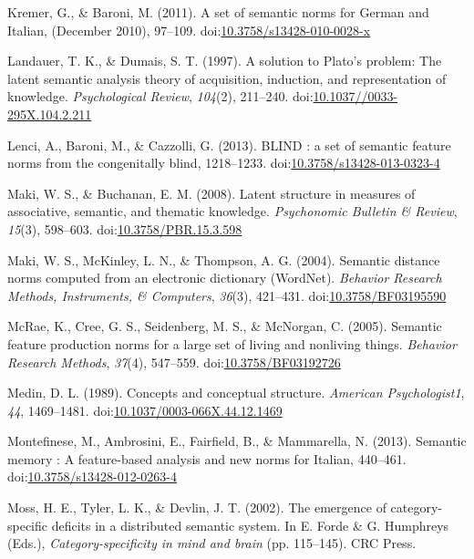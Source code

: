 \documentclass[english,man]{apa6}
\theoremstyle{definition}
\theoremstyle{definition}
\theoremstyle{definition}
\theoremstyle{remark}
\begin{document}
\hypertarget{ref-Kremer2011}{}
Kremer, G., \& Baroni, M. (2011). A set of semantic norms for German and
Italian, (December 2010), 97--109.
doi:\href{https://doi.org/10.3758/s13428-010-0028-x}{10.3758/s13428-010-0028-x}

\hypertarget{ref-Landauer1997}{}
Landauer, T. K., \& Dumais, S. T. (1997). A solution to Plato's problem:
The latent semantic analysis theory of acquisition, induction, and
representation of knowledge. \emph{Psychological Review}, \emph{104}(2),
211--240.
doi:\href{https://doi.org/10.1037//0033-295X.104.2.211}{10.1037//0033-295X.104.2.211}

\hypertarget{ref-Lenci2013}{}
Lenci, A., Baroni, M., \& Cazzolli, G. (2013). BLIND : a set of semantic
feature norms from the congenitally blind, 1218--1233.
doi:\href{https://doi.org/10.3758/s13428-013-0323-4}{10.3758/s13428-013-0323-4}

\hypertarget{ref-Maki2008}{}
Maki, W. S., \& Buchanan, E. M. (2008). Latent structure in measures of
associative, semantic, and thematic knowledge. \emph{Psychonomic
Bulletin \& Review}, \emph{15}(3), 598--603.
doi:\href{https://doi.org/10.3758/PBR.15.3.598}{10.3758/PBR.15.3.598}

\hypertarget{ref-Maki2004}{}
Maki, W. S., McKinley, L. N., \& Thompson, A. G. (2004). Semantic
distance norms computed from an electronic dictionary (WordNet).
\emph{Behavior Research Methods, Instruments, \& Computers},
\emph{36}(3), 421--431.
doi:\href{https://doi.org/10.3758/BF03195590}{10.3758/BF03195590}

\hypertarget{ref-McRae2005}{}
McRae, K., Cree, G. S., Seidenberg, M. S., \& McNorgan, C. (2005).
Semantic feature production norms for a large set of living and
nonliving things. \emph{Behavior Research Methods}, \emph{37}(4),
547--559.
doi:\href{https://doi.org/10.3758/BF03192726}{10.3758/BF03192726}

\hypertarget{ref-Medin1989}{}
Medin, D. L. (1989). Concepts and conceptual structure. \emph{American
Psychologist1}, \emph{44}, 1469--1481.
doi:\href{https://doi.org/10.1037/0003-066X.44.12.1469}{10.1037/0003-066X.44.12.1469}

\hypertarget{ref-Montefinese2013}{}
Montefinese, M., Ambrosini, E., Fairfield, B., \& Mammarella, N. (2013).
Semantic memory : A feature-based analysis and new norms for Italian,
440--461.
doi:\href{https://doi.org/10.3758/s13428-012-0263-4}{10.3758/s13428-012-0263-4}

\hypertarget{ref-Moss2002}{}
Moss, H. E., Tyler, L. K., \& Devlin, J. T. (2002). The emergence of
category-specific deficits in a distributed semantic system. In E. Forde
\& G. Humphreys (Eds.), \emph{Category-specificity in mind and brain}
(pp. 115--145). CRC Press.
\end{document}
